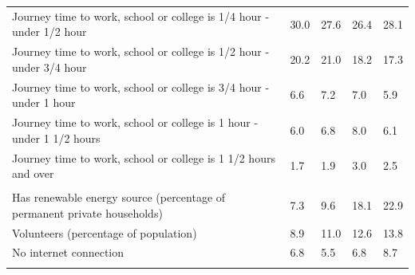 \documentclass{article}
\begin{document}
\begin{table}[h]
\begin{tabular}{KTTTT}
Journey time to work, school or college is 1/4 hour - under 1/2 hour & 30.0& 27.6& 26.4& 28.1\\
Journey time to work, school or college is 1/2 hour - under 3/4 hour & 20.2& 21.0& 18.2& 17.3\\
Journey time to work, school or college is 3/4 hour - under 1 hour & 6.6& 7.2& 7.0& 5.9\\
Journey time to work, school or college is 1 hour - under 1 1/2 hours & 6.0& 6.8& 8.0& 6.1\\
Journey time to work, school or college is 1 1/2 hours and over & 1.7& 1.9& 3.0& 2.5\\
\hline
    \\ 
    \hline
Has renewable energy source (percentage of permanent private households) &  7.3&  9.6& 18.1& 22.9\\
    \hline
Volunteers (percentage of population) &  8.9& 11.0& 12.6& 13.8\\
    \hline
No internet connection& 6.8& 5.5& 6.8& 8.7\\
\hline
\end{tabular}
\end{table}
\end{document}
